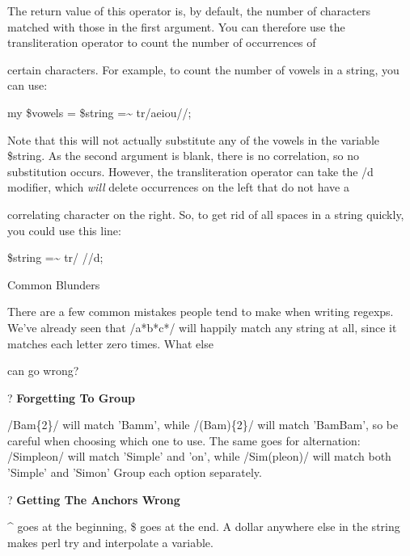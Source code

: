 \documentclass[a4paper,11pt]{book}
\begin{document}
\noindent 

\noindent The return value of this operator is, by default, the number of characters matched with those in the first argument. You can therefore use the transliteration operator to count the number of occurrences of

\noindent certain characters. For example, to count the number of vowels in a string, you can use:

\noindent 

\noindent my \$vowels = \$string =\~{} tr/aeiou//;

\noindent 

\noindent Note that this will not actually substitute any of the vowels in the variable \$string. As the second argument is blank, there is no correlation, so no substitution occurs. However, the transliteration operator can take the /d modifier, which \textit{will }delete occurrences on the left that do not have a

\noindent correlating character on the right. So, to get rid of all spaces in a string quickly, you could use this line:

\noindent 

\noindent \$string =\~{} tr/ //d;

\noindent 

\noindent 

\noindent Common Blunders

\noindent 

\noindent There  are a few  common mistakes  people  tend  to  make  when  writing  regexps.  We've  already  seen that /a*b*c*/ will happily match any string at all, since it matches each letter zero times. What else

\noindent can go wrong?

\noindent 

\noindent ? \textbf{Forgetting To Group}

\noindent /Bam\{2\}/ will match 'Bamm', while /(Bam)\{2\}/ will match 'BamBam', so be careful when choosing which one to use. The same goes for alternation: /Simple\textbar on/ will match 'Simple' and 'on', while /Sim(ple\textbar on)/ will match both 'Simple' and 'Simon' Group each option separately.

\noindent 

\noindent ? \textbf{Getting The Anchors Wrong}

\noindent \^{} goes at the beginning, \$ goes at the end. A dollar anywhere else in the string makes perl try and interpolate a variable.
\end{document}
